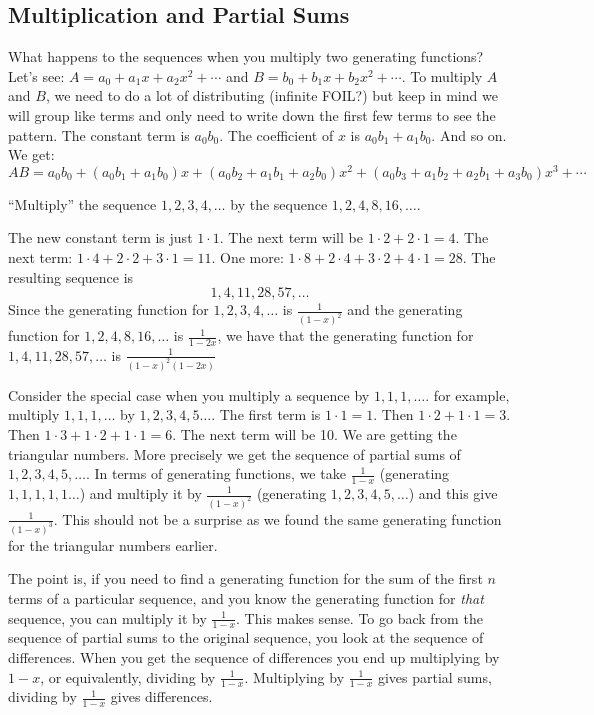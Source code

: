 \documentclass[12pt]{article}
\begin{document}
  \subsection{Multiplication and Partial Sums}

What happens to the sequences when you multiply two generating functions?  Let's see: $A = a_0 + a_1x + a_2x^2 + \cdots$ and $B = b_0 + b_1x + b_2x^2 + \cdots$.  To multiply $A$ and $B$, we need to do a lot of distributing (infinite FOIL?) but keep in mind we will group like terms and only need to write down the first few terms to see the pattern.  The constant term is $a_0b_0$.  The coefficient of $x$ is  $a_0b_1 + a_1b_0$.  And so on.  We get:
 \[AB = a_0b_0 + (a_0b_1 + a_1b_0)x + (a_0b_2 + a_1b_1 + a_2b_0)x^2 + (a_0b_3 + a_1b_2 + a_2b_1 + a_3b_0)x^3 + \cdots\]

\begin{example}
 ``Multiply'' the sequence $1, 2, 3, 4, \ldots$ by the sequence $1, 2, 4, 8, 16, \ldots$.

 \begin{solution}
  The new constant term is just $1 \cdot 1$.  The next term will be $1\cdot 2 + 2 \cdot 1 = 4$.  The next term: $1 \cdot 4 + 2 \cdot 2 + 3 \cdot 1 = 11$.  One more: $1 \cdot 8 + 2 \cdot 4 + 3 \cdot 2 + 4 \cdot 1 = 28$.  The resulting sequence is
  \[1, 4, 11, 28, 57, \ldots\]
  Since the generating function for $1,2,3,4, \ldots$ is $\frac{1}{(1-x)^2}$ and the generating function for $1,2,4,8, 16, \ldots$ is $\frac{1}{1-2x}$, we have that the generating function for $1,4, 11, 28, 57, \ldots$ is $\frac{1}{(1-x)^2(1-2x)}$
 \end{solution}

\end{example}

Consider the special case when you multiply a sequence by $1, 1, 1, \ldots$.  for example, multiply $1,1,1,\ldots$ by $1, 2, 3, 4, 5\ldots$.  The first term is $1\cdot 1 = 1$.  Then $1\cdot 2 + 1 \cdot 1 = 3$.  Then $1\cdot 3 + 1\cdot 2 + 1 \cdot 1 = 6$.  The next term will be 10.  We are getting the triangular numbers.  More precisely we get the sequence of partial sums of $1,2,3,4,5, \ldots$.  In terms of generating functions, we take $\frac{1}{1-x}$ (generating $1,1,1,1,1\ldots$) and multiply it by $\frac{1}{(1-x)^2}$ (generating $1,2,3,4,5,\ldots$) and this give $\frac{1}{(1-x)^3}$.  This should not be a surprise as we found the same generating function for the triangular numbers earlier.

The point is, if you need to find a generating function for the sum of the first $n$ terms of a particular sequence, and you know the generating function for {\em that} sequence, you can multiply it by $\frac{1}{1-x}$.  This makes sense.  To go back from the sequence of partial sums to the original sequence, you look at the sequence of differences.  When you get the sequence of differences you end up multiplying by $1-x$, or equivalently, dividing by $\frac{1}{1-x}$.  Multiplying by $\frac{1}{1-x}$ gives partial sums, dividing by $\frac{1}{1-x}$ gives differences.
\end{document}
